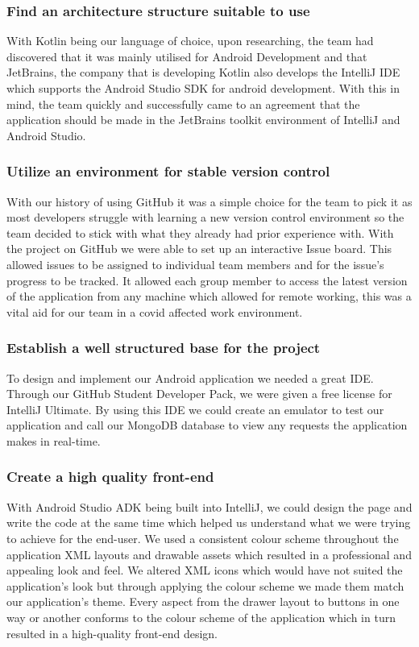 \subsubsection {Find an architecture structure suitable to use}
With Kotlin being our language of choice, upon researching, the team had discovered that it was mainly utilised for Android Development and that JetBrains, the company that is developing Kotlin also develops the IntelliJ IDE which supports the Android Studio SDK for android development. With this in mind, the team quickly and successfully came to an agreement that the application should be made in the JetBrains toolkit environment of IntelliJ and Android Studio.
\subsubsection {Utilize an environment for stable version control}
With our history of using GitHub it was a simple choice for the team to pick it as most developers struggle with learning a new version control environment so the team decided to stick with what they already had prior experience with. \newline
With the project on GitHub we were able to set up an interactive Issue board. This allowed issues to be assigned to individual team members and for the issue's progress to be tracked. It allowed each group member to access the latest version of the application from any machine which allowed for remote working, this was a vital aid for our team in a covid affected work environment.
\subsubsection {Establish a well structured base for the project}
To design and implement our Android application we needed a great IDE. Through our GitHub Student Developer Pack, we were given a free license for IntelliJ Ultimate. By using this IDE we could create an emulator to test our application and call our MongoDB database to view any requests the application makes in real-time.
\subsubsection {Create a high quality front-end}
With Android Studio ADK being built into IntelliJ, we could design the page and write the code at the same time which helped us understand what we were trying to achieve for the end-user. We used a consistent colour scheme throughout the application XML layouts and drawable assets which resulted in a professional and appealing look and feel.
\newline
\newline
We altered XML icons which would have not suited the application's look but through applying the colour scheme we made them match our application's theme. Every aspect from the drawer layout to buttons in one way or another conforms to the colour scheme of the application which in turn resulted in a high-quality front-end design.
